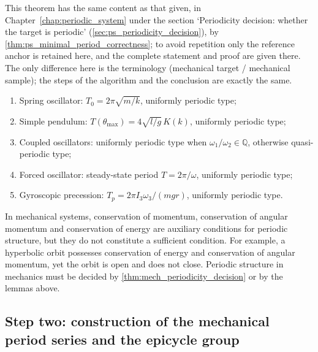 \begin{theorem}\label{thm:mech_minimal_period_correctness}
This theorem has the same content as that given, in Chapter~\ref{chap:periodic_system} under the section `Periodicity decision: whether the target is periodic' (\cref{sec:ps_periodicity_decision}), by \cref{thm:ps_minimal_period_correctness}; to avoid repetition only the reference anchor is retained here, and the complete statement and proof are given there. The only difference here is the terminology (mechanical target / mechanical sample); the steps of the algorithm and the conclusion are exactly the same.
\end{theorem}

\begin{example}\label{ex:mech_periodic_examples}
\begin{enumerate}[label=(\roman*)]
    \item Spring oscillator: $T_0=2\pi\sqrt{m/k}$, uniformly periodic type;
    \item Simple pendulum: $T(\theta_{\max})=4\sqrt{l/g}\,K(k)$, uniformly periodic type;
    \item Coupled oscillators: uniformly periodic type when $\omega_1/\omega_2\in\mathbb Q$, otherwise quasi-periodic type;
    \item Forced oscillator: steady-state period $T=2\pi/\omega$, uniformly periodic type;
    \item Gyroscopic precession: $T_p=2\pi I_3\omega_3/(mgr)$, uniformly periodic type.
\end{enumerate}
\end{example}

\begin{remark}\label{rem:mech_invariant_not_period}
In mechanical systems, conservation of momentum, conservation of angular momentum and conservation of energy are auxiliary conditions for periodic structure, but they do not constitute a sufficient condition. For example, a hyperbolic orbit possesses conservation of energy and conservation of angular momentum, yet the orbit is open and does not close. Periodic structure in mechanics must be decided by \cref{thm:mech_periodicity_decision} or by the lemmas above.
\end{remark}

\subsection{Step two: construction of the mechanical period series and the epicycle group}

